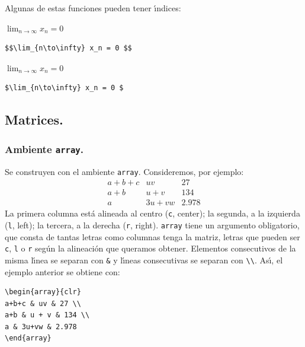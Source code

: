 Algunas de estas funciones pueden tener {\'\i}ndices:

\vspace{.3cm}
{\small
\begin{minipage}[t]{4cm}
${\displaystyle \lim_{n\to\infty} x_n = 0} $
\end{minipage}
\hspace{1cm}
\begin{minipage}[t]{4cm}
\begin{verbatim}
$$\lim_{n\to\infty} x_n = 0 $$
\end{verbatim}
\end{minipage}

\vspace{.3cm}
\begin{minipage}[t]{4cm}
$\lim_{n\to\infty} x_n = 0 $
\end{minipage}
\hspace{1cm}
\begin{minipage}[t]{4cm}
\begin{verbatim}
$\lim_{n\to\infty} x_n = 0 $
\end{verbatim}
\end{minipage}
}
\vspace{.3cm}

\subsection{Matrices.}
\label{matrices}

\subsubsection{Ambiente {\tt array}.}

Se construyen con el ambiente \verb+array+. Consideremos, por
ejemplo: 
$$\begin{array}{clr}
a+b+c & uv & 27 \\
a+b & u + v & 134 \\
a & 3u+vw & 2.978 
\end{array}
$$
La primera columna est{\'a} alineada al centro (\verb+c+, center); la
segunda, a la izquierda (\verb+l+, left); la tercera, a la derecha
(\verb+r+, right). \verb+array+ tiene un argumento obligatorio, que
consta de tantas letras como columnas tenga la matriz, letras que
pueden ser \verb+c+, \verb+l+ o \verb+r+ seg{\'u}n la alineaci{\'o}n que
queramos obtener. Elementos consecutivos de la misma l\'{\i}nea se
separan con \verb+&+ y l\'{\i}neas consecutivas se separan con
\verb+\\+. As\'{\i}, el ejemplo anterior se obtiene con:
\begin{center}
\begin{verbatim}
\begin{array}{clr}
a+b+c & uv & 27 \\
a+b & u + v & 134 \\
a & 3u+vw & 2.978 
\end{array}
\end{verbatim}
\end{center}

